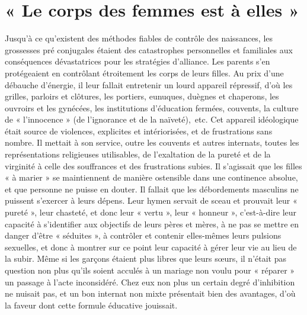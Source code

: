 

\chapter{« Le corps des femmes est à elles »}


 Jusqu'à ce qu'existent des méthodes fiables de contrôle des naissances, les grossesses pré conjugales étaient des catastrophes personnelles et familiales aux conséquences dévastatrices pour les stratégies d'alliance. Les parents s'en protégeaient en contrôlant étroitement les corps de leurs filles. Au prix d'une débauche d'énergie, il leur fallait entretenir un lourd appareil répressif, d'où les grilles, parloirs et clôtures, les portiers, eunuques, duègnes et chaperons, les ouvroirs et les gynécées, les institutions d'éducation fermées, couvents, la culture de « l'innocence » (de l'ignorance et de la naïveté),~etc. Cet appareil idéologique était source de violences, explicites et intériorisées, et de frustrations sans nombre. Il mettait à son service, outre les couvents et autres internats, toutes les représentations religieuses utilisables, de l'exaltation de la pureté et de la virginité à celle des souffrances et des frustrations subies. Il s'agissait que les filles « à marier » se maintiennent de manière ostensible dans une continence absolue, et que personne ne puisse en douter. Il fallait que les débordements masculins ne puissent s'exercer à leurs dépens. Leur hymen servait de sceau et prouvait leur « pureté », leur chasteté, et donc leur « vertu », leur « honneur », c'est-à-dire leur capacité à s'identifier aux objectifs de leurs pères et mères, à ne pas se mettre en danger d'être « séduites », à contrôler et contenir elles-mêmes leurs pulsions sexuelles, et donc à montrer sur ce point leur capacité à gérer leur vie au lieu de la subir. Même si les garçons étaient plus libres que leurs sœurs, il n'était pas question non plus qu'ils soient acculés à un mariage non voulu pour « réparer » un passage à l'acte inconsidéré. Chez eux non plus un certain degré d'inhibition ne nuisait pas, et un bon internat non mixte présentait bien des avantages, d'où la faveur dont cette formule éducative jouissait.

